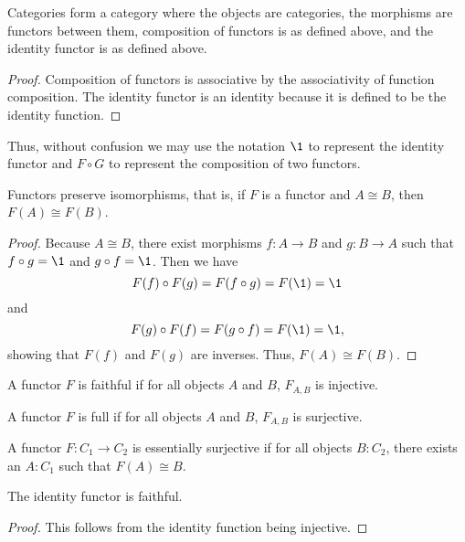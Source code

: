 \documentclass[../math.tex]{subfiles}
\begin{document}
\begin{theorem}
    Categories form a category \Cat where the objects are categories, the
    morphisms are functors between them, composition of functors is as defined
    above, and the identity functor is as defined above.
\end{theorem}
\begin{proof}
    Composition of functors is associative by the associativity of function
    composition.  The identity functor is an identity because it is defined to
    be the identity function.
\end{proof}

Thus, without confusion we may use the notation $\1$ to represent the
identity functor and $F \circ G$ to represent the composition of two functors.

\begin{theorem}
    Functors preserve isomorphisms, that is, if $F$ is a functor and $A \cong
    B$, then $F(A) \cong F(B)$.
\end{theorem}
\begin{proof}
    Because $A \cong B$, there exist morphisms $f : A \to B$ and $g : B \to A$
    such that $f \circ g = \1$ and $g \circ f = \1$.  Then we have
    \[
        F(f) \circ F(g) = F(f \circ g) = F(\1) = \1
    \]
    and
    \[
        F(g) \circ F(f) = F(g \circ f) = F(\1) = \1,
    \]
    showing that $F(f)$ and $F(g)$ are inverses.  Thus, $F(A) \cong F(B)$.
\end{proof}

\begin{definition}
    A functor $F$ is faithful if for all objects $A$ and $B$, $F_{A,B}$ is
    injective.
\end{definition}

\begin{definition}
    A functor $F$ is full if for all objects $A$ and $B$, $F_{A,B}$ is
    surjective.
\end{definition}

\begin{definition}
    A functor $F : C_1 \to C_2$ is essentially surjective if for all objects $B
    : C_2$, there exists an $A : C_1$ such that $F(A) \cong B$.
\end{definition}

\begin{theorem}
    The identity functor is faithful.
\end{theorem}
\begin{proof}
    This follows from the identity function being injective.
\end{proof}
\end{document}
